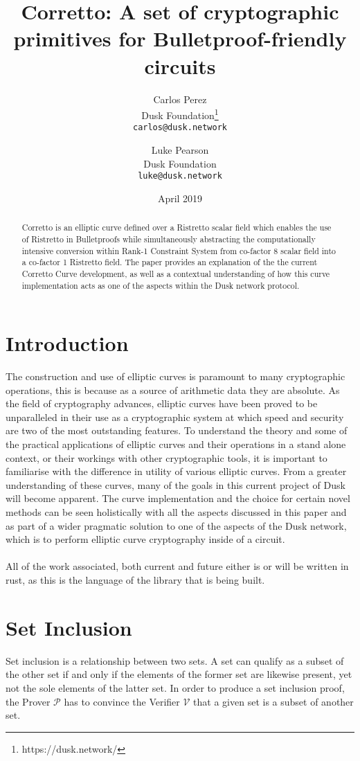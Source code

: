 \documentclass{article}
\title{Corretto: A set of cryptographic primitives for Bulletproof-friendly circuits}
\author{
  Carlos Perez\\
  Dusk Foundation\footnote{https://dusk.network/}\\
  \texttt{carlos@dusk.network}
  \and
  Luke Pearson\\
  Dusk Foundation\\
  \texttt{luke@dusk.network}
}
\date{April 2019}
\begin{document}
\maketitle
\thispagestyle{empty}
\pagestyle{empty}

\begin{abstract}
Corretto is an elliptic curve defined over a Ristretto scalar field which enables the use of Ristretto in Bulletproofs while simultaneously abstracting the computationally intensive conversion within Rank-1 Constraint System from co-factor 8 scalar field into a co-factor 1 Ristretto field. The paper provides an explanation of the the current Corretto Curve development, as well as a contextual understanding of how this curve implementation acts as one of the aspects within the Dusk network protocol.


\end{abstract}

\newpage

\tableofcontents

\newpage

\section{Introduction}
The construction and use of elliptic curves is paramount to many cryptographic operations, this is because as a source of arithmetic data they are absolute.  As the field of cryptography advances, elliptic curves have been proved to be unparalleled in their use as a cryptographic system at which speed and security are two of the most outstanding features.  To understand the theory and some of the practical applications of elliptic curves and their operations in a stand alone context, or their workings with other cryptographic tools, it is important to familiarise with the difference in utility of various elliptic curves. From a greater understanding of these curves, many of the goals in this current project of Dusk will become apparent.  The curve implementation and the choice for certain novel methods can be seen holistically with all the aspects discussed in this paper and as part of a wider pragmatic solution to one of the aspects of the Dusk network, which is to perform elliptic curve cryptography inside of a circuit. \\\\
All of the work associated, both current and future either is or will be written in rust, as this is the language of the library that is being built.
\section{Set Inclusion}
Set inclusion is a relationship between two sets. A set can qualify as a subset of the other set if and only if the elements of the former set are likewise present, yet not the sole elements of the latter set. In order to produce a set inclusion proof, the Prover $\mathcal{P}$ has to convince the Verifier $\mathcal{V}$ that a given set is a subset of another set.
\end{document}
